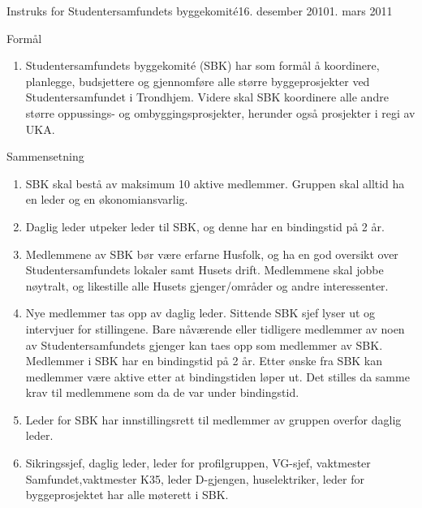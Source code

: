 \begin{instruks}{Instruks for Studentersamfundets byggekomité}{16. desember 2010}{1. mars 2011}

    \begin{instruksledd}{Formål}
        \begin{enumerate}
            \item Studentersamfundets byggekomit\'e (SBK) har som formål å koordinere, planlegge,
                budsjettere og
                gjennomføre alle større byggeprosjekter ved Studentersamfundet i Trondhjem. Videre
                skal SBK koordinere
                alle andre større oppussings- og ombyggingsprosjekter, herunder også prosjekter i
                regi av UKA.
        \end{enumerate}
    \end{instruksledd}

    \begin{instruksledd}{Sammensetning}
        \begin{enumerate}
            \item SBK skal bestå av maksimum 10 aktive medlemmer. Gruppen skal alltid ha en leder og en
                økonomiansvarlig.
            \item Daglig leder utpeker leder til SBK, og denne har en bindingstid på 2 år.
            \item Medlemmene av SBK bør være erfarne Husfolk, og ha en god oversikt over
                Studentersamfundets lokaler
                samt Husets drift. Medlemmene skal jobbe nøytralt, og likestille alle Husets
                gjenger/områder og andre interessenter.
            \item Nye medlemmer tas opp av daglig leder. Sittende SBK sjef lyser ut og intervjuer
                for stillingene. Bare
                nåværende eller tidligere medlemmer av noen av Studentersamfundets gjenger kan
                taes opp som medlemmer av SBK. Medlemmer i SBK har en bindingstid på 2 år.
		Etter ønske fra SBK kan medlemmer være aktive etter at
		bindingstiden løper ut. Det stilles da samme krav til medlemmene
		som da de var under bindingstid.
            \item Leder for SBK har innstillingsrett til medlemmer av gruppen overfor daglig
                leder.
            \item Sikringssjef, daglig leder, leder for profilgruppen, VG-sjef, vaktmester 
	    	Samfundet,vaktmester K35, leder D-gjengen, huselektriker, leder
		for byggeprosjektet har alle møterett i SBK.
        \end{enumerate}
    \end{instruksledd}


\end{instruks}
